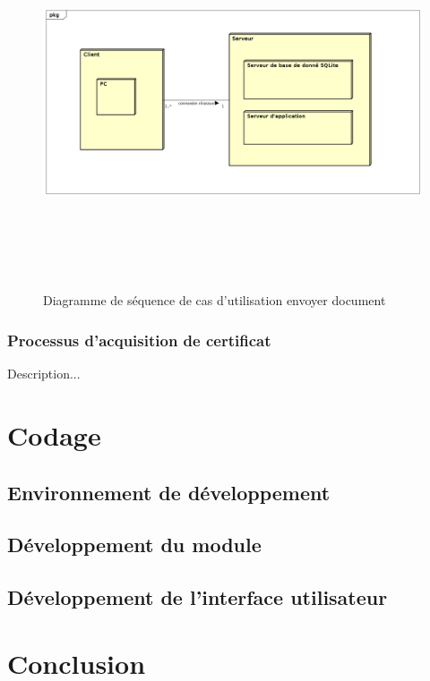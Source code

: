 		 	\begin{figure}[H]
		 		\centering
		 		\includegraphics[width=17cm, height=11cm]{../Diagrammes/DiagrammeSequences/diagrammedeploy.png}
		 		\caption{Diagramme de séquence de cas d'utilisation envoyer document}
		 		\label{diadeploy}
		 	\end{figure}
		 	
			\subsubsection{Processus d'acquisition de certificat}
			Description...
		
		
	\section{Codage}
		\subsection{Environnement de développement}
		\subsection{Développement du module}
		\subsection{Développement de l'interface utilisateur}
	\section*{Conclusion}
	
	
